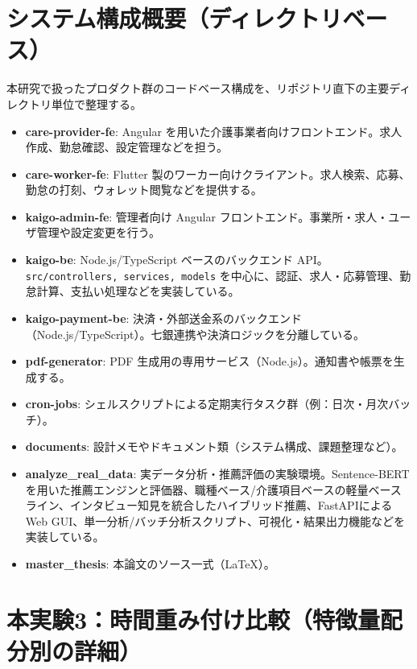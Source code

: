 \documentclass[11pt,a4paper,report,ja=standard,lualatex]{bxjsreport}
\begin{document}
\chapter{システム構成概要（ディレクトリベース）}
本研究で扱ったプロダクト群のコードベース構成を、リポジトリ直下の主要ディレクトリ単位で整理する。

\begin{itemize}
	\item \textbf{care-provider-fe}: Angular を用いた介護事業者向けフロントエンド。求人作成、勤怠確認、設定管理などを担う。
	\item \textbf{care-worker-fe}: Flutter 製のワーカー向けクライアント。求人検索、応募、勤怠の打刻、ウォレット閲覧などを提供する。
	\item \textbf{kaigo-admin-fe}: 管理者向け Angular フロントエンド。事業所・求人・ユーザ管理や設定変更を行う。
	\item \textbf{kaigo-be}: Node.js/TypeScript ベースのバックエンド API。\texttt{src/controllers, services, models} を中心に、認証、求人・応募管理、勤怠計算、支払い処理などを実装している。
	\item \textbf{kaigo-payment-be}: 決済・外部送金系のバックエンド（Node.js/TypeScript）。七銀連携や決済ロジックを分離している。
	\item \textbf{pdf-generator}: PDF 生成用の専用サービス（Node.js）。通知書や帳票を生成する。
	\item \textbf{cron-jobs}: シェルスクリプトによる定期実行タスク群（例：日次・月次バッチ）。
	\item \textbf{documents}: 設計メモやドキュメント類（システム構成、課題整理など）。
	\item \textbf{analyze\_real\_data}: 実データ分析・推薦評価の実験環境。Sentence-BERTを用いた推薦エンジンと評価器、職種ベース/介護項目ベースの軽量ベースライン、インタビュー知見を統合したハイブリッド推薦、FastAPIによるWeb GUI、単一分析/バッチ分析スクリプト、可視化・結果出力機能などを実装している。
	\item \textbf{master\_thesis}: 本論文のソース一式（\LaTeX{}）。
\end{itemize}

\chapter{本実験3：時間重み付け比較（特徴量配分別の詳細）}
\label{app:exp3-time-weighting-details}

\end{document}
